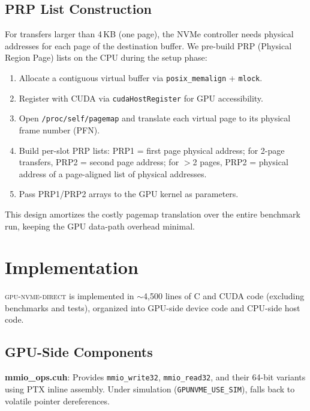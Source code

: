 \documentclass{article}
\newcommand{\sysname}{\textsc{gpu-nvme-direct}}
\begin{document}
\subsection{PRP List Construction}

For transfers larger than 4\,KB (one page), the NVMe controller needs
physical addresses for each page of the destination buffer. We pre-build PRP
(Physical Region Page) lists on the CPU during the setup phase:

\begin{enumerate}[leftmargin=*,topsep=2pt,itemsep=1pt]
\item Allocate a contiguous virtual buffer via \texttt{posix\_memalign} +
  \texttt{mlock}.
\item Register with CUDA via \texttt{cudaHostRegister} for GPU accessibility.
\item Open \texttt{/proc/self/pagemap} and translate each virtual page to its
  physical frame number (PFN).
\item Build per-slot PRP lists: PRP1 = first page physical address; for
  2-page transfers, PRP2 = second page address; for $>$2 pages, PRP2 = physical
  address of a page-aligned list of physical addresses.
\item Pass PRP1/PRP2 arrays to the GPU kernel as parameters.
\end{enumerate}

This design amortizes the costly pagemap translation over the entire benchmark
run, keeping the GPU data-path overhead minimal.

\section{Implementation}
\label{sec:impl}

\sysname{} is implemented in $\sim$4{,}500 lines of C and CUDA code (excluding
benchmarks and tests), organized into GPU-side device code and CPU-side host
code.

\subsection{GPU-Side Components}

\textbf{mmio\_ops.cuh}: Provides \texttt{mmio\_write32},
\texttt{mmio\_read32}, and their 64-bit variants using PTX inline assembly.
Under simulation (\texttt{GPUNVME\_USE\_SIM}), falls back to volatile pointer
dereferences.
\end{document}
